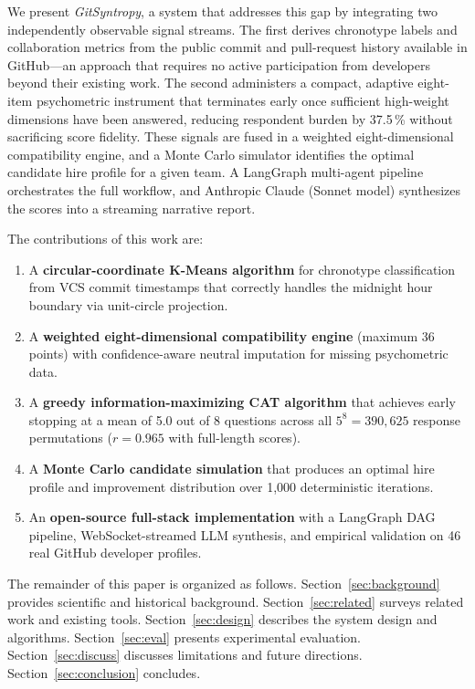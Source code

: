 \documentclass[conference]{IEEEtran}
\begin{document}
We present \textit{GitSyntropy}, a system that addresses this gap
by integrating two independently observable signal streams.  The
first derives chronotype labels and collaboration metrics from the
public commit and pull-request history available in GitHub---an
approach that requires no active participation from developers
beyond their existing work.  The second administers a compact,
adaptive eight-item psychometric instrument that terminates early
once sufficient high-weight dimensions have been answered, reducing
respondent burden by 37.5\,\% without sacrificing score fidelity.
These signals are fused in a weighted eight-dimensional compatibility
engine, and a Monte Carlo simulator identifies the optimal candidate
hire profile for a given team.  A LangGraph multi-agent pipeline
orchestrates the full workflow, and Anthropic Claude (Sonnet model) synthesizes
the scores into a streaming narrative report.

\medskip
\noindent The contributions of this work are:
\begin{enumerate}
  \item A \textbf{circular-coordinate K-Means algorithm} for
    chronotype classification from VCS commit timestamps that
    correctly handles the midnight hour boundary via unit-circle
    projection.
  \item A \textbf{weighted eight-dimensional compatibility engine}
    (maximum 36 points) with confidence-aware neutral imputation
    for missing psychometric data.
  \item A \textbf{greedy information-maximizing CAT algorithm} that
    achieves early stopping at a mean of 5.0 out of 8 questions
    across all $5^8 = 390{,}625$ response permutations
    ($r = 0.965$ with full-length scores).
  \item A \textbf{Monte Carlo candidate simulation} that produces
    an optimal hire profile and improvement distribution over
    1,000 deterministic iterations.
  \item An \textbf{open-source full-stack implementation} with a
    LangGraph DAG pipeline, WebSocket-streamed LLM synthesis, and
    empirical validation on 46 real GitHub developer profiles.
\end{enumerate}

\medskip
The remainder of this paper is organized as follows.
Section~\ref{sec:background} provides scientific and historical
background.  Section~\ref{sec:related} surveys related work and
existing tools.  Section~\ref{sec:design} describes the system
design and algorithms.  Section~\ref{sec:eval} presents
experimental evaluation.  Section~\ref{sec:discuss} discusses
limitations and future directions.  Section~\ref{sec:conclusion}
concludes.
\end{document}
